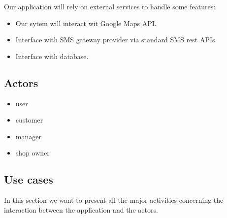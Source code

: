 Our application will rely on external services to handle some features:

\begin{itemize}
    \item Our sytem will interact wit Google Maps API.
    \item Interface with SMS gateway provider via standard SMS rest APIs.
    \item Interface with database. %
\end{itemize}

\subsection{Actors}
\label{subsect:actors}


\begin{itemize}
    \item user
    \item customer
    \item manager
    \item shop owner
\end{itemize}

\subsection{Use cases}
\label{subsect:usecases} 

In this section we want to present all the major activities concerning the interaction between the application and the actors.

